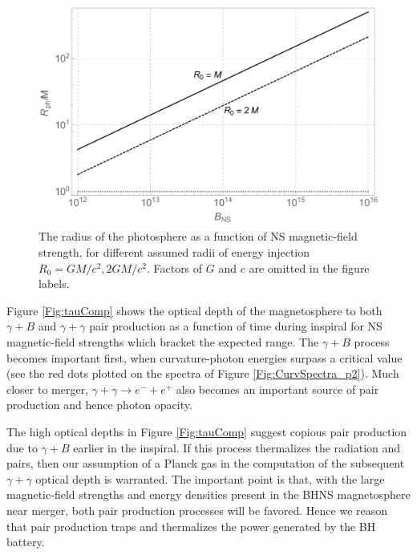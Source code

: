\begin{figure}
\begin{center}
\includegraphics[scale=0.32]{figures/ch7/RPhot_vs_BNS_M10.pdf}
\end{center}
\caption{The radius of the photosphere as a function of NS
  magnetic-field strength, for different assumed radii of energy
  injection $R_0=GM/c^2, 2GM/c^2$. Factors of $G$ and $c$ are omitted
  in the figure labels.}
\label{Fig:Rphot}
\end{figure}




Figure \ref{Fig:tauComp} shows the optical depth of the magnetosphere
to both $\gamma + B$ and $\gamma + \gamma$ pair production as a
function of time during inspiral for NS magnetic-field strengths which
bracket the expected range. The $\gamma + B$ process becomes important
first, when curvature-photon energies surpass a critical value (see
the red dots plotted on the spectra of Figure
\ref{Fig:CurvSpectra_p2}). Much closer to merger, $\gamma + \gamma
\rightarrow e^- + e^+$ also becomes an important source of pair
production and hence photon opacity.

The high optical depths in Figure \ref{Fig:tauComp} suggest copious
pair production due to $\gamma + B$ earlier in the inspiral.  If this
process thermalizes the radiation and pairs, then our assumption of a
Planck gas in the computation of the subsequent $\gamma + \gamma$
optical depth is warranted. The important point is that, with the
large magnetic-field strengths and energy densities present in the
BHNS magnetosphere near merger, both pair production processes will be
favored. Hence we reason that pair production traps and thermalizes
the power generated by the BH battery.


